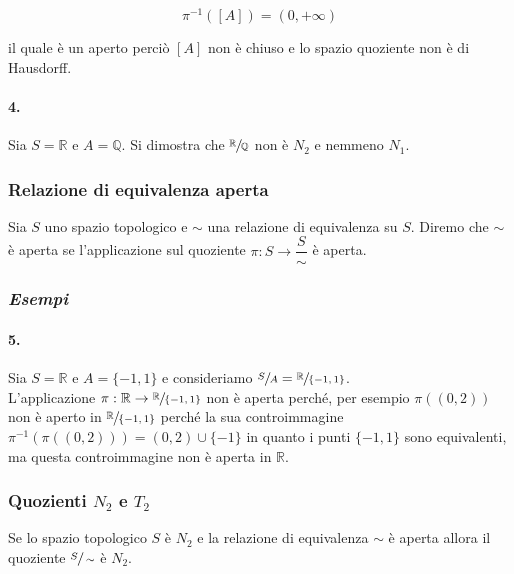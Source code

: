 \begin{equation}
	\pi^{-1} ([A]) = (0,+\infty)
\end{equation}

il quale è un aperto perciò $ [A] $ non è chiuso e lo spazio quoziente non è di Hausdorff.

\paragraph{4.}

Sia $ S = \mathbb{R} $ e $ A = \mathbb{Q} $. Si dimostra che $ \sfrac{\mathbb{R}}{\mathbb{Q}} $ non è $ N_{2} $ e nemmeno $ N_{1} $.

\subsubsection{Relazione di equivalenza aperta}

Sia $ S $ uno spazio topologico e $ \sim $ una relazione di equivalenza su $ S $. Diremo che $ \sim $ è aperta se l'applicazione sul quoziente $ \pi : S \to \dfrac{S}{\sim} $ è aperta.

\subsubsection{\textit{Esempi}}

\paragraph{5.}

Sia $ S = \mathbb{R} $ e $ A = \{-1,1\} $ e consideriamo $ \sfrac{S}{A} = \sfrac{\mathbb{R}}{\{-1,1\}} $.\\
L'applicazione $ \pi : \mathbb{R} \to \sfrac{\mathbb{R}}{\{-1,1\}} $ non è aperta perché, per esempio $ \pi((0,2)) $ non è aperto in $ \sfrac{\mathbb{R}}{\{-1,1\}} $ perché la sua controimmagine $ \pi^{-1}(\pi((0,2))) = (0,2) \cup \{-1\} $ in quanto i punti $ \{-1,1\} $ sono equivalenti, ma questa controimmagine non è aperta in $ \mathbb{R} $.

\subsubsection{Quozienti $ N_{2} $ e $ T_{2} $}

\begin{definition}\label{prop-n2}
	Se lo spazio topologico $ S $ è $ N_{2} $ e la relazione di equivalenza $ \sim $ è aperta allora il quoziente $ \sfrac{S}{\sim} $ è $ N_{2} $.
\end{definition}

